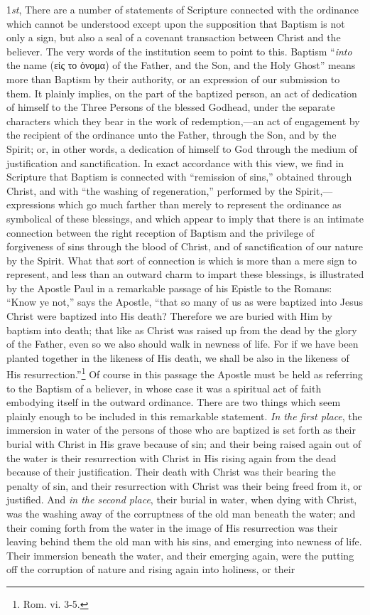 \documentclass[english,]{book}
\begin{document}
1\emph{st}, There are a number of statements of Scripture connected with the ordinance which cannot be understood except upon the supposition that Baptism is not only a sign, but also a seal of a covenant transaction between Christ and the believer. The very words of the institution seem to point to this. Baptism ``\emph{into} the name (εἰς το ὀνομα) of the Father, and the Son, and the Holy Ghost'' means more than Baptism by their authority, or an expression of our submission to them. It plainly implies, on the part of the baptized person, an act of dedication of himself to the Three Persons of the blessed Godhead, under the separate characters which they bear in the work of redemption,---an act of engagement by the recipient of the ordinance unto the Father, through the Son, and by the Spirit; or, in other words, a dedication of himself to God through the medium of justification and sanctification. In exact accordance with this view, we find in Scripture that Baptism is connected with ``remission of sins,'' obtained through Christ, and with ``the washing of regeneration,'' performed by the Spirit,---expressions which go much farther than merely to represent the ordinance as symbolical of these blessings, and which appear to imply that there is an intimate connection between the right reception of Baptism and the privilege of forgiveness of sins through the blood of Christ, and of sanctification of our nature by the Spirit. What that sort of connection is which is more than a mere sign to represent, and less than an outward charm to impart these blessings, is illustrated by the Apostle Paul in a remarkable passage of his Epistle to the Romans: ``Know ye not,'' says the Apostle, ``that so many of us as were baptized into Jesus Christ were baptized into His death? Therefore we are buried with Him by baptism into death; that like as Christ was raised up from the dead by the glory of the Father, even so we also should walk in newness of life. For if we have been planted together in the likeness of His death, we shall be also in the likeness of His resurrection.''\footnote{Rom. vi. 3-5.} Of course in this passage the Apostle must be held as referring to the Baptism of a believer, in whose case it was a spiritual act of faith embodying itself in the outward ordinance. There are two things which seem plainly enough to be included in this remarkable statement. \emph{In the first place}, the immersion in water of the persons of those who are baptized is set forth as their burial with Christ in His grave because of sin; and their being raised again out of the water is their resurrection with Christ in His rising again from the dead because of their justification. Their death with Christ was their bearing the penalty of sin, and their resurrection with Christ was their being freed from it, or justified. And \emph{in the second place}, their burial in water, when dying with Christ, was the washing away of the corruptness of the old man beneath the water; and their coming forth from the water in the image of His resurrection was their leaving behind them the old man with his sins, and emerging into newness of life. Their immersion beneath the water, and their emerging again, were the putting off the corruption of nature and rising again into holiness, or their 
\end{document}
